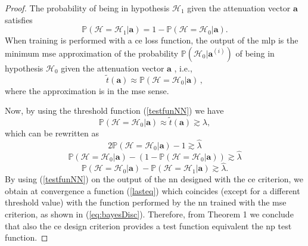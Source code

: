 \documentclass[draftcls,onecolumn,12pt]{IEEEtran}
\begin{document}
\begin{proof}
The probability of being in hypothesis $\mathcal{H}_1$ given the attenuation vector $\bm{a}$ satisfies
\begin{equation}
    \mathbb{P}(\mathcal{H} = \mathcal{H}_1|\bm{a} ) = 1- \mathbb{P}(\mathcal{H} = \mathcal{H}_0|\bm{a} ).
\end{equation}
When training is performed with a \ac{ce} loss function, the output of the \ac{mlp} is the minimum \ac{mse} approximation of the probability $\mathbb{P}(\mathcal{H}_0|\bm{a}^{(i)})$ of being in hypothesis $\mathcal{H}_0$ given the attenuation vector $\bm{a}$ \underline{\cite[Chapter~5.2]{Bishop2006}}, i.e.,
\begin{equation}
    \tilde{t}(\bm{a}) \approx \mathbb{P}(\mathcal{H}=\mathcal{H}_0|\bm{a})\,,
\end{equation} 
where the approximation is in the \ac{mse} sense. 

Now, by using the threshold function (\ref{testfunNN}) we have 
\begin{equation}
    \mathbb{P}(\mathcal{H}=\mathcal{H}_0|\bm{a}) \approx  \tilde{t}(\bm{a}) \gtrsim \lambda,
\end{equation}
which can be rewritten as
\begin{equation}
    2\mathbb{P}(\mathcal{H}=\mathcal{H}_0|\bm{a} )-1 \gtrsim \hat{\lambda}
\end{equation}
\begin{equation}
    \mathbb{P}(\mathcal{H}=\mathcal{H}_0|\bm{a} )-(1-\mathbb{P}(\mathcal{H}=\mathcal{H}_0|\bm{a} )) \gtrsim \hat{\lambda}
\end{equation}
\begin{equation}
\label{lasteq}
    \mathbb{P}(\mathcal{H}=\mathcal{H}_0|\bm{a} )-\mathbb{P}(\mathcal{H}=\mathcal{H}_1|\bm{a} ) \gtrsim \hat{\lambda}.
\end{equation}
By using (\ref{testfunNN}) on the output of the \ac{nn} designed with the \ac{ce} criterion, we obtain at convergence a function (\ref{lasteq}) which coincides (except for a different threshold value) with the function performed by the \ac{nn} trained with the \ac{mse} criterion, as shown in (\ref{eq:bayesDisc}). Therefore, from Theorem 1 we conclude that also the \ac{ce} design criterion provides a test function equivalent the \ac{np} test function.
\end{proof}
\end{document}

